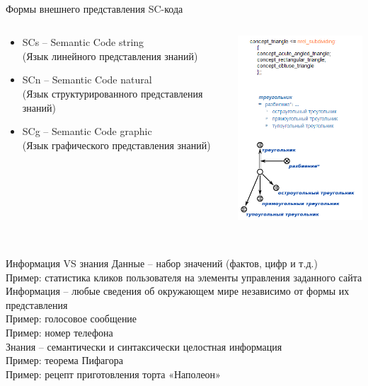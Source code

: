 \begin{frame}{\\Формы внешнего представления SC-кода}
	\vspace{10mm}
	\begin{columns}[T,onlytextwidth]
		\begin{column}{0.5\textwidth}
			\begin{itemize}
				\item SCs -- Semantic Code string \\ (Язык линейного представления знаний) \vspace{10mm}
				\item SCn -- Semantic Code natural \\ (Язык структурированного представления знаний) \vspace{10mm}
				\item SCg -- Semantic Code graphic \\ (Язык графического представления знаний) 
			\end{itemize}
		\end{column}
		\begin{column}{0.56\textwidth}
			\includegraphics[width=50mm]{./part1/pictures/ostis-basics-1.png}
		\end{column}
	\end{columns}
\end{frame}

\begin{frame}{\\Информация VS знания}
	\vspace{10mm}
	Данные -- набор значений (фактов, цифр и т.д.)\\
	Пример: статистика кликов пользователя на элементы управления заданного сайта \\
	\vspace{5mm}
	Информация -- любые сведения об окружающем мире независимо от формы их представления \\
	Пример: голосовое сообщение \\
	Пример: номер телефона \\
	\vspace{5mm}
	Знания -- семантически и синтаксически целостная информация \\
	Пример: теорема Пифагора \\
	Пример: рецепт приготовления торта «Наполеон»
\end{frame}




